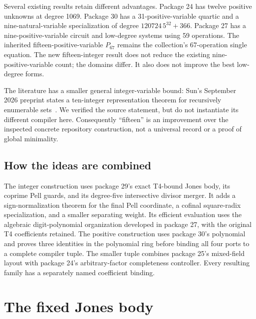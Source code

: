 \documentclass[11pt]{article}
\theoremstyle{definition}\newtheorem{definition}[theorem]{Definition}
\begin{document}
Several existing results retain different advantages. Package 24 has twelve positive unknowns at degree 1069. Package 30 has a 31-positive-variable quartic and a nine-natural-variable specialization of degree $120724\,5^{32}+366$. Package 27 has a nine-positive-variable circuit and low-degree systems using 59 operations. The inherited fifteen-positive-variable $P_{67}$ remains the collection's 67-operation single equation. The new fifteen-integer result does not reduce the existing nine-positive-variable count; the domains differ. It also does not improve the best low-degree forms.

The literature has a smaller general integer-variable bound: Sun's September 2026 preprint states a ten-integer representation theorem for recursively enumerable sets~\cite{sun}. We verified the source statement, but do not instantiate its different compiler here. Consequently ``fifteen'' is an improvement over the inspected concrete repository construction, not a universal record or a proof of global minimality.

\subsection{How the ideas are combined}
The integer construction uses package 29's exact T4-bound Jones body, its coprime Pell guards, and its degree-five intersective divisor merger. It adds a sign-normalization theorem for the final Pell coordinate, a cofinal square-radix specialization, and a smaller separating weight. Its efficient evaluation uses the algebraic digit-polynomial organization developed in package 27, with the original T4 coefficients retained. The positive construction uses package 30's polynomial and proves three identities in the polynomial ring before binding all four ports to a complete compiler tuple. The smaller tuple combines package 25's mixed-field layout with package 24's arbitrary-factor completeness controller. Every resulting family has a separately named coefficient binding.

\section{The fixed Jones body}\label{sec:base}
\end{document}
